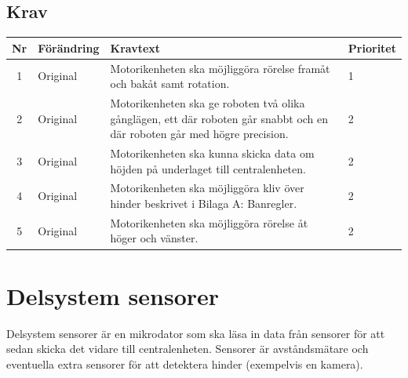 \documentclass[a4paper,titlepage,12pt]{article}
\begin{document}
	\subsection{Krav}
	\begin{table}[h]
		\label{tab:label}
		\begin{tabularx}{\textwidth}{|c|l|X|l|}
			\hline
			\textbf{Nr} & \textbf{Förändring} & \textbf{Kravtext} & \textbf{Prioritet} 
				\\ \hline

			1 & Original & Motorikenheten ska möjliggöra rörelse framåt och bakåt samt rotation. & 1
				\\ \hline

			2 & Original & Motorikenheten ska ge roboten två olika gånglägen, ett där roboten går 
				snabbt och en där roboten går med högre precision.& 2
				\\ \hline

			3 & Original & Motorikenheten ska kunna skicka data om höjden på underlaget
  				till centralenheten. & 2
				\\ \hline

			4 & Original & Motorikenheten ska möjliggöra kliv över hinder beskrivet i Bilaga A:
  				Banregler. & 2
				\\ \hline

			5 & Original & Motorikenheten ska möjliggöra rörelse åt höger och vänster. & 2 \\\hline

		\end{tabularx}
	\end{table}


	\section{Delsystem sensorer}
	Delsystem sensorer är en mikrodator som ska läsa in data från sensorer för att sedan skicka 
	det vidare till centralenheten. Sensorer är avståndsmätare och eventuella extra sensorer 
	för att detektera hinder (exempelvis en kamera).
\end{document}

